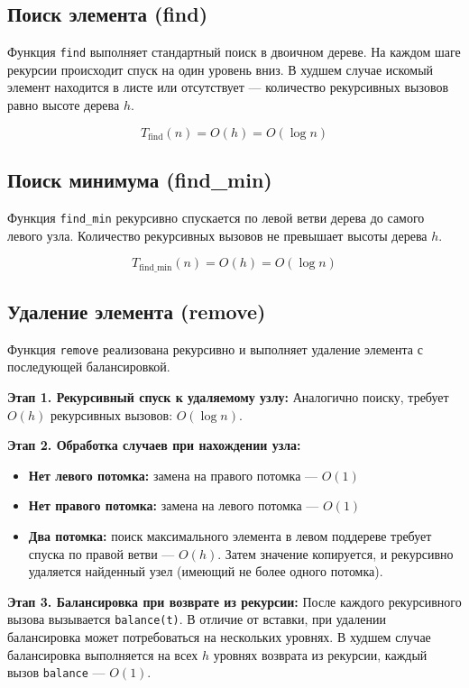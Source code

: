 \documentclass[otchet]{SCWorks}
\begin{document}
\subsection*{Поиск элемента (find)}

Функция \texttt{find} выполняет стандартный поиск в двоичном дереве. На каждом шаге рекурсии происходит спуск на один уровень вниз. В худшем случае искомый элемент находится в листе или отсутствует — количество рекурсивных вызовов равно высоте дерева \(h\).

\[
T_{\text{find}}(n) = O(h) = O(\log n)
\]

\subsection*{Поиск минимума (find\_min)}

Функция \texttt{find\_min} рекурсивно спускается по левой ветви дерева до самого левого узла. Количество рекурсивных вызовов не превышает высоты дерева \(h\).

\[
T_{\text{find\_min}}(n) = O(h) = O(\log n)
\]

\subsection*{Удаление элемента (remove)}

Функция \texttt{remove} реализована рекурсивно и выполняет удаление элемента с последующей балансировкой.

\textbf{Этап 1. Рекурсивный спуск к удаляемому узлу:}
Аналогично поиску, требует \(O(h)\) рекурсивных вызовов: \(O(\log n)\).

\textbf{Этап 2. Обработка случаев при нахождении узла:}
\begin{itemize}
    \item \textbf{Нет левого потомка:} замена на правого потомка --- \(O(1)\)
    \item \textbf{Нет правого потомка:} замена на левого потомка --- \(O(1)\)
    \item \textbf{Два потомка:} поиск максимального элемента в левом поддереве требует спуска по правой ветви — \(O(h)\). Затем значение копируется, и рекурсивно удаляется найденный узел (имеющий не более одного потомка).
\end{itemize}

\textbf{Этап 3. Балансировка при возврате из рекурсии:}
После каждого рекурсивного вызова вызывается \texttt{balance(t)}. В отличие от вставки, при удалении балансировка может потребоваться на нескольких уровнях. В худшем случае балансировка выполняется на всех \(h\) уровнях возврата из рекурсии, каждый вызов \texttt{balance} — \(O(1)\).
\end{document}
